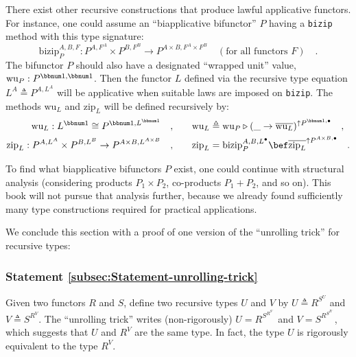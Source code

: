 There  exist other recursive constructions that produce lawful applicative
functors. For instance, one could assume an \textsf{``}biapplicative bifunctor\textsf{''}
$P$ having a \lstinline!bizip! method with this type signature:
\[
\text{bizip}_{P}^{A,B,F}:P^{A,F^{A}}\times P^{B,F^{B}}\rightarrow P^{A\times B,F^{A}\times F^{B}}\quad(\text{for all functors }F)\quad.
\]
The bifunctor $P$ should also have a designated \textsf{``}wrapped unit\textsf{''}
value, $\text{wu}_{P}:P^{\bbnum 1,\bbnum 1}$. Then the functor $L$
defined via the recursive type equation $L^{A}\triangleq P^{A,L^{A}}$
will be applicative when suitable laws are imposed on \lstinline!bizip!.
The methods $\text{wu}_{L}$ and $\text{zip}_{L}$ will be defined
recursively by:
\begin{align*}
\text{wu}_{L}:L^{\bbnum 1}\cong P^{\bbnum 1,L^{\bbnum 1}}\quad, & \quad\quad\text{wu}_{L}\triangleq\text{wu}_{P}\triangleright(\_\rightarrow\overline{\text{wu}_{L}})^{\uparrow P^{\bbnum 1,\bullet}}\quad,\\
\text{zip}_{L}:P^{A,L^{A}}\times P^{B,L^{B}}\rightarrow P^{A\times B,L^{A\times B}}\quad, & \quad\quad\text{zip}_{L}=\text{bizip}_{P}^{A,B,L^{\bullet}}\bef\overline{\text{zip}_{L}}^{\uparrow P^{A\times B,\bullet}}\quad.
\end{align*}

To find what biapplicative bifunctors $P$ exist, one could continue
with structural analysis (considering products $P_{1}\times P_{2}$,
co-products $P_{1}+P_{2}$, and so on). This book will not pursue
that analysis further, because we already found sufficiently many
type constructions required for practical applications.

We conclude this section with a proof of one version of the \textsf{``}unrolling
trick\textsf{''} for recursive types:

\subsubsection{Statement \label{subsec:Statement-unrolling-trick}\ref{subsec:Statement-unrolling-trick}}

Given two functors $R$ and $S$, define two recursive types $U$
and $V$ by $U\triangleq R^{S^{U}}$ and $V\triangleq S^{R^{V}}$.
The \textsf{``}unrolling trick\textsf{''} writes (non-rigorously) $U=R^{S^{R^{S^{\iddots}}}}\!$
and $V=S^{R^{S^{R^{\iddots}}}}\!$, which suggests that $U$ and $R^{V}$
are the same type. In fact, the type $U$ is rigorously equivalent
to the type $R^{V}$.

